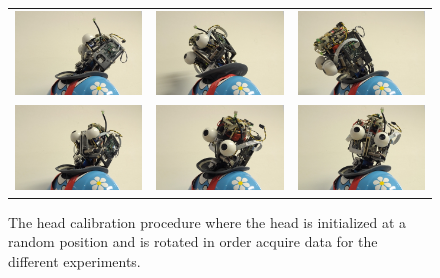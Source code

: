 \begin{figure}
    \centering
    \begin{tabular}{ccc}
        \includegraphics[width=0.25\columnwidth]{images/pos_1} &  
        \includegraphics[width=0.25\columnwidth]{images/pos_2} & 
        \includegraphics[width=0.25\columnwidth]{images/pos_3} \\
        \includegraphics[width=0.25\columnwidth]{images/pos_4} &  
        \includegraphics[width=0.25\columnwidth]{images/pos_5} & 
        \includegraphics[width=0.25\columnwidth]{images/pos_6} \\
    \end{tabular}
    \caption{The head calibration procedure where the head is initialized at a random position and is rotated in order acquire data for the different experiments.}
    \label{fig:head_calibration_procedure}
\end{figure}

